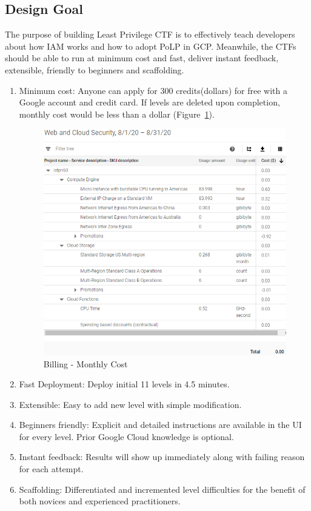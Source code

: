 \documentclass[a4paper,twoside]{article}
\begin{document}
\subsection{Design Goal}
The purpose of building Least Privilege CTF is to effectively teach developers about how IAM works and how to adopt PoLP in GCP. Meanwhile, the CTFs should be able to run at minimum cost and fast, deliver instant feedback, extensible, friendly to beginners and scaffolding.
\begin{enumerate}
\item Minimum cost: Anyone can apply for 300 credits(dollars) for free with a Google account and credit card. If levels are deleted upon completion, monthly cost would be less than a dollar (Figure~\ref{fig:cost}). 
\begin{figure}[!h]
  \centering
  \includegraphics[width=\linewidth]{pic/cost}
  \caption {Billing - Monthly Cost}
  \label{fig:cost}
\end{figure}
\item Fast Deployment:  Deploy initial 11 levels in 4.5 minutes.
\item Extensible: Easy to add new level with simple modification. 
\item Beginners friendly: Explicit and detailed instructions are available in the UI for every level. Prior Google Cloud knowledge is optional.
\item Instant feedback: Results will show up immediately along with failing reason for each attempt.
\item Scaffolding: Differentiated and incremented level difficulties for the benefit of both novices and experienced practitioners.

\end{enumerate}
\end{document}

